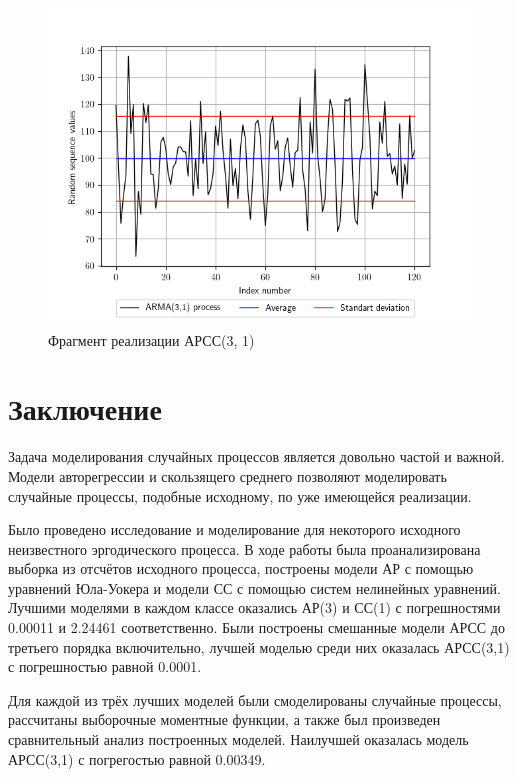 \documentclass[12pt, fleqn]{article}
\begin{document}
{	\begin{figure}[H]
		\includegraphics{plot_arma_modeled.png}
		\caption{Фрагмент реализации АРСС(3, 1)}
	\end{figure}
}
			
\newpage
{}
{}
\section*{Заключение}
{
	  	Задача моделирования случайных процессов является довольно частой и важной. Модели авторегрессии и скользящего среднего позволяют моделировать случайные процессы, подобные исходному, по уже имеющейся реализации.

	  	Было проведено исследование и моделирование для некоторого исходного неизвестного эргодического процесса. В ходе работы была проанализирована выборка из отсчётов исходного процесса, построены модели АР с помощью уравнений Юла-Уокера и модели СС с помощью систем нелинейных уравнений. Лучшими моделями в каждом классе оказались АР(3) и СС(1) с погрешностями 0.00011 и 2.24461 соответственно. Были построены смешанные модели АРСС до третьего порядка включительно, лучшей моделью среди них оказалась АРСС(3,1) с погрешностью равной 0.0001.
	  	
	  	Для каждой из трёх лучших моделей были смоделированы случайные процессы, рассчитаны выборочные моментные функции, а также был произведен сравнительный анализ построенных моделей. Наилучшей оказалась модель АРСС(3,1) с погрегостью равной 0.00349. 
}
			
\end{document}
